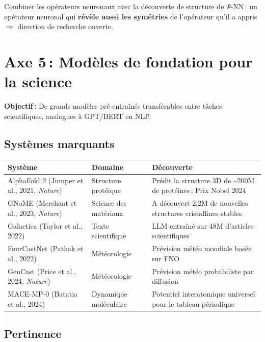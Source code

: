 \documentclass[11pt,a4paper]{article}
\begin{document}
Combiner les opérateurs neuronaux avec la découverte de structure de $\Psi$-NN\,: un opérateur neuronal qui \textbf{révèle aussi les symétries} de l'opérateur qu'il a appris $\Rightarrow$ direction de recherche ouverte.

\section{Axe 5\,: Modèles de fondation pour la science}

\textbf{Objectif\,:} De grands modèles pré-entraînés transférables entre tâches scientifiques, analogues à GPT/BERT en NLP.

\subsection{Systèmes marquants}

\begin{center}
\renewcommand{\arraystretch}{1.3}
\begin{tabular}{@{}p{3.5cm} p{3cm} p{6cm}@{}}
\toprule
\textbf{Système} & \textbf{Domaine} & \textbf{Découverte} \\
\midrule
AlphaFold 2 (Jumper et al., 2021, \textit{Nature}) & Structure protéique & Prédit la structure 3D de \textasciitilde200M de protéines\,; Prix Nobel 2024 \\
\addlinespace
GNoME (Merchant et al., 2023, \textit{Nature}) & Science des matériaux & A découvert 2,2M de nouvelles structures cristallines stables \\
\addlinespace
Galactica (Taylor et al., 2022) & Texte scientifique & LLM entraîné sur 48M d'articles scientifiques \\
\addlinespace
FourCastNet (Pathak et al., 2022) & Météorologie & Prévision météo mondiale basée sur FNO \\
\addlinespace
GenCast (Price et al., 2024, \textit{Nature}) & Météorologie & Prévision météo probabiliste par diffusion \\
\addlinespace
MACE-MP-0 (Batatia et al., 2024) & Dynamique moléculaire & Potentiel interatomique universel pour le tableau périodique \\
\bottomrule
\end{tabular}
\end{center}

\subsection{Pertinence}
\end{document}
